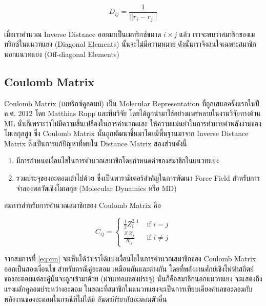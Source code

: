 \begin{equation}
    D_{ij} = \frac{1}{||r_{i} - r_{j}||}
\end{equation}

เมื่อเราคำนวณ Inverse Distance ออกมาเป็นเมทริกซ์ขนาด $i \times j$ แล้ว เราจะพบว่าสมาชิกของเมทริกซ์ในแนวทแยง (Diagonal 
Elements) นั้นจะไม่มีความหมาย ดังนั้นเราจึงสนใจเฉพาะสมาชิกนอกแนวทแยง (Off-diagonal Elements)

\subsection{Coulomb Matrix}
\label{ssec:coulomb_mat}

Coulomb Matrix (เมทริกซ์คูลอมบ์) เป็น Molecular Representation ที่ถูกเสนอครั้งแรกในปี ค.ศ. 2012 โดย Matthias Rupp 
และทีมวิจัย\autocite{rupp2012} โดยได้ถูกนำมาใช้อย่างแพร่หลายในงานวิจัยทางด้าน ML นั่นก็เพราะว่าไม่มีความสิ้นเปลืองในการคำนวณและ%
ให้ความแม่นยำในการทำนายค่าพลังงานของโมเลกุลสูง ซึ่ง Coulomb Matrix นั้นถูกพัฒนาขึ้นมาโดยมีพื้นฐานมาจาก Inverse Distance Matrix 
ซึ่งเป็นการแก้ปัญหาที่พบใน Distance Matrix สองส่วนดังนี้

\begin{enumerate}
    \item มีการกำหนดเงื่อนไขในการคำนวณสมาชิกโดยกำหนดค่าของสมาชิกในแนวทแยง
    
    \item รวมประจุของอะตอมเข้าไปด้วย ซึ่งเป็นพารามิเตอร์สำคัญในการพัฒนา Force Field สำหรับการจำลองพลวัตเชิงโมเลกุล (Molecular 
    Dynamics หรือ MD)
\end{enumerate}

สมการสำหรับการคำนวณสมาชิกของ Coulomb Matrix คือ

\begin{equation}\label{eq:cm}
    C_{ij} =
    \begin{cases}
    \frac{1}{2} Z_i^{2.4} & \text{ if } i = j \\ 
    \frac{Z_i Z_j}{R_{ij}} & \text{ if } i \neq j
    \end{cases}
\end{equation}

จากสมการที่ \ref{eq:cm} จะเห็นได้ว่าเราได้แบ่งเงื่อนไขในการคำนวณสมาชิกของ Coulomb Matrix ออกเป็นสองเงื่อนไข สำหรับกรณีคู่อะตอม%
เหมือนกันและต่างกัน โดยที่พลังงานศักย์เชิงไฟฟ้าสถิตย์ของอะตอมแต่ละคู่นั้นจะถูกเข้ามาด้วย (ผ่านเทอมของประจุ) นั่นก็คือสมาชิกนอกแนวทแยง%
จะแสดงถึงแรงผลักคูลอมบ์ระหว่างอะตอม ในขณะที่สมาชิกในแนวทแยงจะเป็นการเทียบเคียงค่าเลขอะตอมกับพลังงานของอะตอมในกรณีที่ไม่ได้มี%
อันตรกิริยากับอะตอมตัวอื่น

